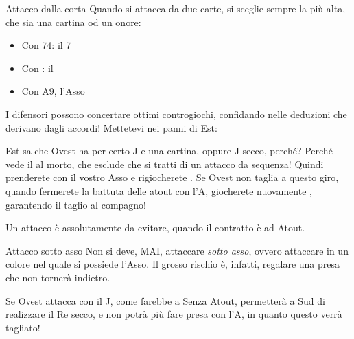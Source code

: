 \documentclass[../corsofiori.tex]{subfiles}
\begin{document}
\begin{regola}{Attacco dalla corta}
    Quando si attacca da due carte, si sceglie sempre la più alta, che sia una cartina od un onore:
    \begin{itemize}
        \item Con 74: il 7
        \item Con : il \Ten
        \item Con A9, l'Asso
    \end{itemize}
\end{regola}

I difensori possono concertare ottimi controgiochi, confidando nelle deduzioni che derivano dagli accordi! Mettetevi nei
panni di Est:

\newgame
{}
\leftupper{\boardtext*}%
{\dealertext\quad}{\vulnertext}

\showAll*

Est sa che Ovest ha per certo J e una cartina, oppure J secco, perché? Perché vede il \Ten\Di al morto, che esclude che
si tratti di un attacco da sequenza! Quindi prenderete con il vostro Asso e rigiocherete \qu. Se Ovest non taglia a questo
giro, quando fermerete la battuta delle atout con l'A\He, giocherete nuovamente \qu, garantendo il taglio al compagno!

Un attacco è assolutamente da evitare, quando il contratto è ad Atout.

\begin{regola}{Attacco sotto asso}
    Non si deve, MAI, attaccare \emph{sotto asso}, ovvero attaccare in un colore nel quale si possiede l'Asso.
    Il grosso rischio è, infatti, regalare una presa che non tornerà indietro.


    Se Ovest attacca con il J\Cl, come farebbe a Senza Atout, permetterà a Sud di realizzare il Re secco, e non potrà
    più fare presa con l'A\Cl, in quanto questo verrà tagliato!


\end{regola}
\end{document}

